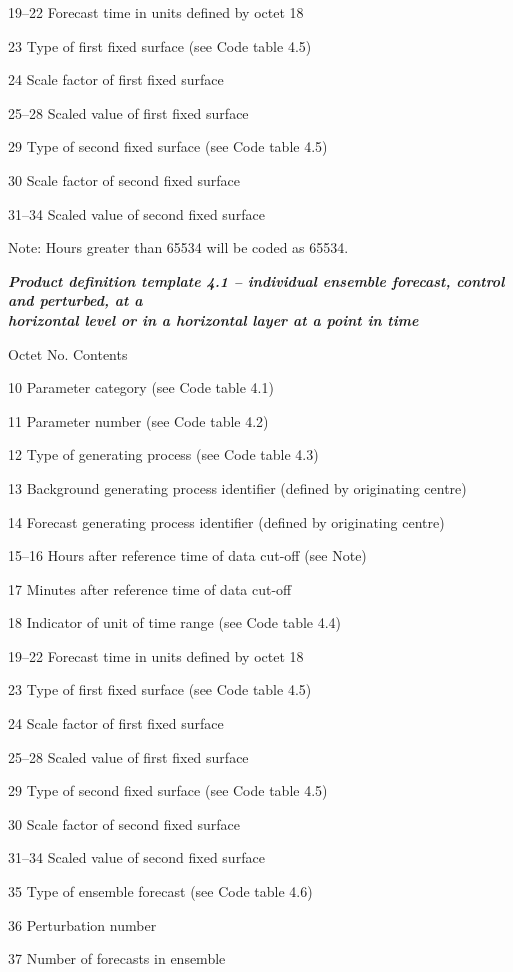 19--22 Forecast time in units defined by octet 18

23 Type of first fixed surface (see Code table 4.5)

24 Scale factor of first fixed surface

25--28 Scaled value of first fixed surface

29 Type of second fixed surface (see Code table 4.5)

30 Scale factor of second fixed surface

31--34 Scaled value of second fixed surface

Note: Hours greater than 65534 will be coded as 65534.

\emph{\textbf{Product definition template 4.1 -- individual ensemble forecast, control and perturbed, at a\\
horizontal level or in a horizontal layer at a point in time}}

Octet No. Contents

10 Parameter category (see Code table 4.1)

11 Parameter number (see Code table 4.2)

12 Type of generating process (see Code table 4.3)

13 Background generating process identifier (defined by originating centre)

14 Forecast generating process identifier (defined by originating centre)

15--16 Hours after reference time of data cut-off (see Note)

17 Minutes after reference time of data cut-off

18 Indicator of unit of time range (see Code table 4.4)

19--22 Forecast time in units defined by octet 18

23 Type of first fixed surface (see Code table 4.5)

24 Scale factor of first fixed surface

25--28 Scaled value of first fixed surface

29 Type of second fixed surface (see Code table 4.5)

30 Scale factor of second fixed surface

31--34 Scaled value of second fixed surface

35 Type of ensemble forecast (see Code table 4.6)

36 Perturbation number

37 Number of forecasts in ensemble

